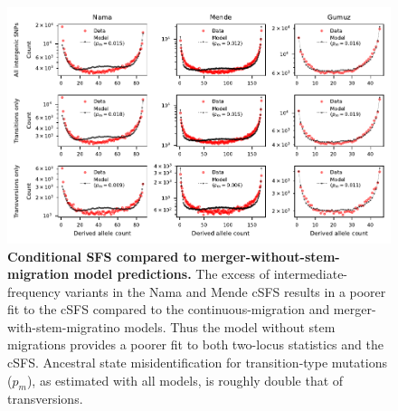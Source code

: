 \documentclass[]{article}
\begin{document}
\begin{figure}[ht]
    \centering
    \includegraphics{figures/supp-csfs-merger-without-stem-migration.pdf}
    \caption{
        \textbf{Conditional SFS compared to merger-without-stem-migration model predictions.}
        The excess of intermediate-frequency variants in the Nama and Mende
        cSFS results in a poorer fit to the cSFS compared to the continuous-migration
        and merger-with-stem-migratino models. Thus the model without stem migrations
        provides a poorer fit 
        to both two-locus statistics and the cSFS.
        Ancestral state misidentification for transition-type mutations ($p_m$), as estimated
        with all models, is roughly double that of transversions.
    }
    \label{fig:supp-csfs-merger-without-stem-migration}
\end{figure}
\end{document}
